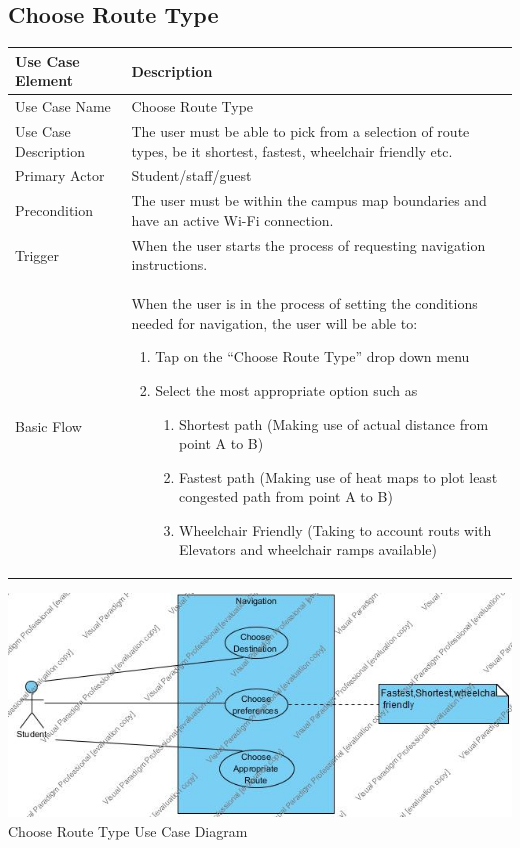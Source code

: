 \documentclass[12pt]{article}
\begin{document}
	\subsection{Choose Route Type}
	\begin{tabular}{|p{4cm}|p{10cm}|}
\hline

Use Case Element & Description \\
\hline

Use Case Name & 
Choose Route Type \\
\hline

Use Case Description & 
The user must be able to pick from a selection of route types, be it shortest, fastest, wheelchair friendly etc.   \\
\hline

Primary Actor & 
Student/staff/guest \\
\hline

Precondition & 
The user must be within the campus map boundaries and have an active Wi-Fi connection.   \\
\hline

Trigger & 
When the user starts the process of requesting navigation instructions.   \\
\hline

Basic Flow & 
When the user is in the process of setting the conditions needed for navigation, the user will be able to:
\begin{enumerate}
\item Tap on the “Choose Route Type” drop down menu
\item Select the most appropriate option such as
	\begin{enumerate}
	\item Shortest path (Making use of actual distance from point A to B)
	\item Fastest path (Making use of heat maps to plot least congested path from point A to B)
	\item Wheelchair Friendly (Taking to account routs with Elevators and wheelchair ramps available)
	\end{enumerate}
\end{enumerate} \\
\hline

\hline

\end{tabular}

\includegraphics[width=\linewidth]{UseCaseDiagram_ChooseRouteType.jpg}
Choose Route Type Use Case Diagram
\end{document}
